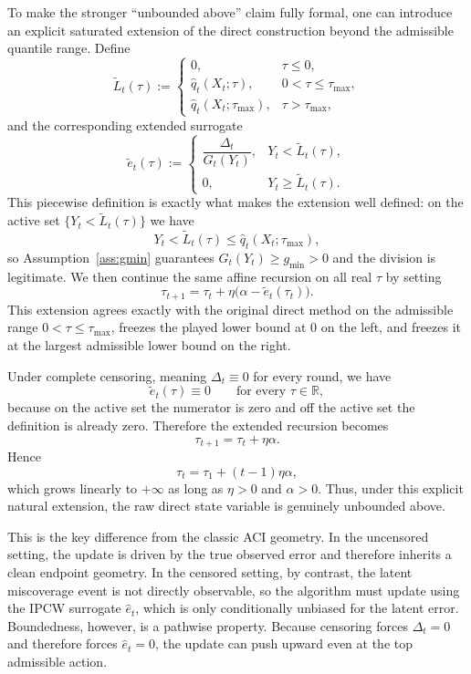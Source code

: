 \documentclass[11pt]{article}
\newcommand{\1}{\mathbf{1}}
\begin{document}
To make the stronger ``unbounded above'' claim fully formal, one can introduce an explicit saturated extension of the direct construction beyond the admissible quantile range. Define
\[
\widetilde L_t(\tau)
:=
\begin{cases}
0, & \tau\le 0,\\[2mm]
\hat q_t(X_t;\tau), & 0<\tau\le \tau_{\max},\\[2mm]
\hat q_t(X_t;\tau_{\max}), & \tau>\tau_{\max},
\end{cases}
\]
and the corresponding extended surrogate
\[
\widetilde e_t(\tau)
:=
\begin{cases}
\dfrac{\Delta_t}{G_t(Y_t)}, & Y_t<\widetilde L_t(\tau),\\[2mm]
0, & Y_t\ge \widetilde L_t(\tau).
\end{cases}
\]
This piecewise definition is exactly what makes the extension well defined: on the active set $\{Y_t<\widetilde L_t(\tau)\}$ we have
\[
Y_t<\widetilde L_t(\tau)\le \hat q_t(X_t;\tau_{\max}),
\]
so Assumption~\ref{ass:gmin} guarantees $G_t(Y_t)\ge g_{\min}>0$ and the division is legitimate.
We then continue the same affine recursion on all real $\tau$ by setting
\[
\tau_{t+1}=\tau_t+\eta\bigl(\alpha-\widetilde e_t(\tau_t)\bigr).
\]
This extension agrees exactly with the original direct method on the admissible range $0<\tau\le \tau_{\max}$, freezes the played lower bound at $0$ on the left, and freezes it at the largest admissible lower bound on the right.

Under complete censoring, meaning $\Delta_t\equiv 0$ for every round, we have
\[
\widetilde e_t(\tau)\equiv 0
\qquad\text{for every }\tau\in\mathbb R,
\]
because on the active set the numerator is zero and off the active set the definition is already zero. Therefore the extended recursion becomes
\[
\tau_{t+1}=\tau_t+\eta\alpha.
\]
Hence
\[
\tau_t=\tau_1+(t-1)\eta\alpha,
\]
which grows linearly to $+\infty$ as long as $\eta>0$ and $\alpha>0$. Thus, under this explicit natural extension, the raw direct state variable is genuinely unbounded above.

This is the key difference from the classic ACI geometry. In the uncensored setting, the update is driven by the true observed error and therefore inherits a clean endpoint geometry. In the censored setting, by contrast, the latent miscoverage event is not directly observable, so the algorithm must update using the IPCW surrogate $\hat e_t$, which is only conditionally unbiased for the latent error. Boundedness, however, is a pathwise property. Because censoring forces $\Delta_t=0$ and therefore forces $\hat e_t=0$, the update can push upward even at the top admissible action.
\end{document}
